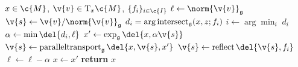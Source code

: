 \begin{algorithm}[H]
	\begin{algorithmic}
		\Require \(x \in \c{M}\), \(\v{v} \in \mathrm{T}_x\c{M}\), \(\{f_i\}_{i \in \c{I}}\)
		\State \(\ell \gets \norm{\v{v}}_\mathfrak{g}\)
		\State \(\v{s} \gets \v{v} / \norm{\v{v}}_\mathfrak{g}\)
		\State \(d_i =  \arg\operatorname{intersect}_\mathfrak{g} (x, z; f_i )\)
		\State \(i \gets \arg\min_i\; d_i \)
		\State \(\alpha \gets \min\del{d_i, \ell} \)
		\State \(x' \gets \exp_\mathfrak{g}\del{x, \alpha\v{s}}\)
		\State \(\v{s} \gets \paralleltransport_\mathfrak{g}\del{x, \v{s}, x'} \)
		\State \(\v{s} \gets \reflect\del{\v{s}, f_i}\)
		\State \(\ell \gets \ell - \alpha\)
		\State \(x \gets x'\)
		\EndWhile
		\State \textbf{return} \(x\)
	\end{algorithmic}
	\caption{\emph{Reflected Step Algorithm}.
		The algorithm operates by repeatedly taking geodesic steps until one of the constraints is violated, or until the step is fully taken.
		Upon hitting the boundary, we parallel-transport the tangent vector to the boundary and then reflect it against it.
		We then start a new geodesic from this point in the new direction.
		The \({\arg} \intersect_t\) function computes the distance one must travel along a geodesic in direction \(\v{s}\) until constraint \(f_i\) is violated.
		For a discussion of \(\paralleltransport\), \(\exp_\mathfrak{g}\) and \(\reflect\) see \cref{sec:riemannain_intro}.
	}
	\label{alg:app_reflected_step_algorithm}
\end{algorithm}

